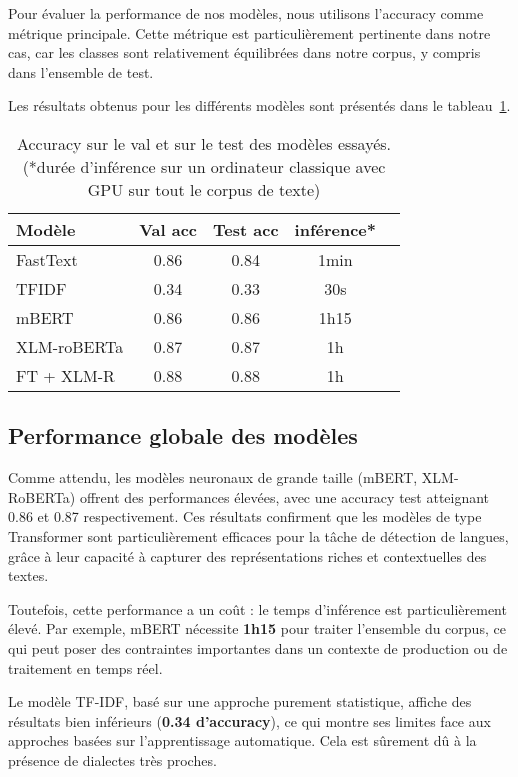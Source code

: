 

Pour évaluer la performance de nos modèles, nous utilisons l'accuracy comme métrique principale. Cette métrique est particulièrement pertinente dans notre cas, car les classes sont relativement équilibrées dans notre corpus, y compris dans l'ensemble de test.

Les résultats obtenus pour les différents modèles sont présentés dans le tableau~\ref{tab:results}.

\begin{table}[ht]
    \centering
    \begin{tabular}{lcccc}
        \toprule
        Modèle & Val acc & Test acc  & inférence* \\
        \midrule
        FastText & 0.86 & 0.84 & 1min \\
        TFIDF & 0.34 & 0.33 & 30s \\
        mBERT & 0.86 & 0.86 & 1h15 \\
        XLM-roBERTa & 0.87 & 0.87 & 1h \\
        FT + XLM-R & 0.88 & 0.88 & 1h \\
        \bottomrule
    \end{tabular}

    \caption{Accuracy sur le val et sur le test des modèles essayés. (*durée d'inférence sur un ordinateur classique avec GPU sur tout le corpus de texte)}
    
    \label{tab:results}
\end{table}
\subsection{Performance globale des modèles}

Comme attendu, les modèles neuronaux de grande taille (mBERT, XLM-RoBERTa) offrent des performances élevées, avec une accuracy test atteignant 0.86 et 0.87 respectivement. Ces résultats confirment que les modèles de type Transformer sont particulièrement efficaces pour la tâche de détection de langues, grâce à leur capacité à capturer des représentations riches et contextuelles des textes.

Toutefois, cette performance a un coût : le temps d'inférence est particulièrement élevé. Par exemple, mBERT nécessite \textbf{1h15} pour traiter l'ensemble du corpus, ce qui peut poser des contraintes importantes dans un contexte de production ou de traitement en temps réel.

Le modèle TF-IDF, basé sur une approche purement statistique, affiche des résultats bien inférieurs (\textbf{0.34 d’accuracy}), ce qui montre ses limites face aux approches basées sur l’apprentissage automatique. Cela est sûrement dû à la présence de dialectes très proches.

